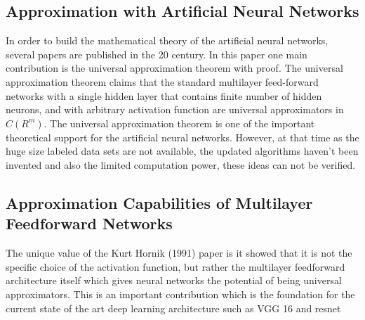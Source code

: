 \documentclass[a4paper,12pt]{article}
\begin{document}
\subsection{Approximation with Artificial Neural Networks \cite{csaji2001}}
In order to build the mathematical theory of the artificial neural networks, several papers are published in the 20 century. In this paper one main contribution is the universal approximation theorem with proof. The universal approximation theorem claims \cite{csaji2001}  that the standard multilayer feed-forward networks with a single hidden layer that contains finite number of hidden neurons, and with arbitrary activation function are universal approximators in $C(R^m)$.  The universal approximation theorem is one of the important theoretical support for the artificial neural networks. However, at that time as the huge size labeled data sets are not available, the updated algorithms haven't been invented and also the limited computation power, these ideas can not be verified.


\subsection{Approximation Capabilities of Multilayer Feedforward Networks \cite{hornik1991} }

The unique value of the Kurt Hornik (1991) \cite{hornik1991} paper is it showed that it is not the specific choice of the activation function, but rather the multilayer feedforward architecture itself which gives neural networks the potential of being universal approximators. This is an important contribution which is the foundation for the current state of the art deep learning architecture such as VGG 16  \cite{SimonyanZ14a} and resnet \cite{DBLP:journals/corr/HeZRS15} \cite{DBLP:journals/corr/GirshickDDM13} \cite{DBLP:conf/iccv/Girshick15} \cite{DBLP:conf/nips/RenHGS15}
\cite{DBLP:journals/corr/RedmonDGF15}
\cite{DBLP:journals/corr/RedmonF16}
\cite{NIPS2012_4824}
\cite{doi:10.1162/neco.1989.1.4.541}
\cite{DBLP:journals/corr/IoffeS15}




  
 
\end{document}
